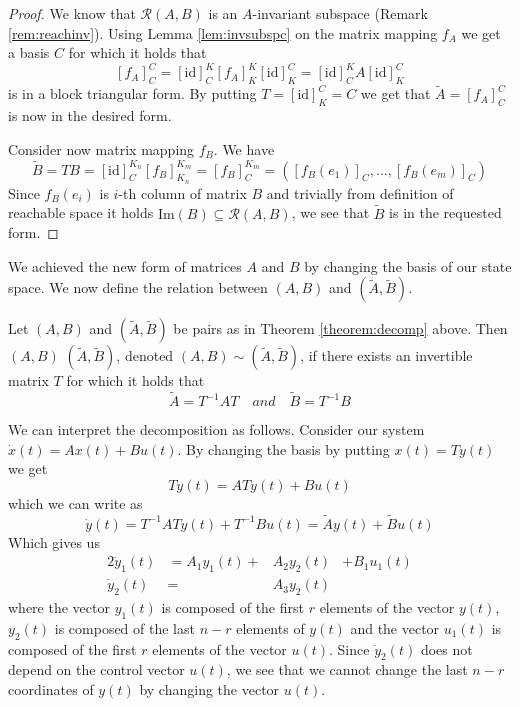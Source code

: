 \begin{proof}
	We know that $\mathcal{R}(A,B)$ is an $A$-invariant subspace (Remark \ref{rem:reachinv}). Using Lemma \ref{lem:invsubspc} on the matrix mapping $f_A$ we get a basis $C$ for which it holds that 
	$$[f_A]^C_C=[\text{id}]^K_C[f_A]^K_K[\text{id}]^C_K=[\text{id}]^K_CA[\text{id}]^C_K$$ 
	is in a block triangular form. By putting $T=[\text{id}]^C_K=C$ we get that $\widetilde{A}=[f_A]^C_C$ is now in the desired form.

	Consider now matrix mapping $f_B$. We have $$\widetilde{B}=TB=[\text{id}]^{K_n}_C[f_B]^{K_m}_{K_n}=[f_B]^{K_m}_C=([f_B(e_1)]_C,\ldots,[f_B(e_m)]_C)$$ Since $f_B(e_i)$ is $i$-th column of matrix $B$ and trivially from definition of reachable space it holds $\text{Im}(B)\subseteq \mathcal{R}(A,B)$, we see that $\widetilde{B}$ is in the requested form.
\end{proof}

We achieved the new form of matrices $A$ and $B$ by changing the basis of our state space. We now define the relation between $(A,B)$ and $(\widetilde{A},\widetilde{B}).$

\begin{definition}
	Let $(A,B)$ and $(\widetilde{A},\widetilde{B})$ be pairs as in Theorem \ref{theorem:decomp} above. Then $(A,B)$  $(\widetilde{A},\widetilde{B})$, denoted $(A,B) \sim (\widetilde{A},\widetilde{B})$, if there exists an invertible matrix $T$ for which it holds that $$\widetilde{A}=T^{-1}AT\quad and\quad\widetilde{B}=T^{-1}B$$
\end{definition}

We can interpret the decomposition as follows. Consider our system $\dot{x}(t)=Ax(t)+Bu(t)$. By changing the basis by putting $x(t)=Ty(t)$ we get 
$$T\dot{y}(t)=ATy(t)+Bu(t)$$ 
which we can write as 
$$\dot{y}(t)=T^{-1}ATy(t)+T^{-1}Bu(t)=\widetilde{A}y(t)+\widetilde{B}u(t)$$ 
Which gives us 
\begin{alignat*}{2}
	\dot{y}_1(t)&=A_1y_1(t)+&A_2y_2(t)&+B_1u_1(t) \\
	\dot{y}_2(t)&=&A_3y_2(t)&
\end{alignat*}
where the vector $y_1(t)$ is composed of the first $r$ elements of the vector $y(t)$, $y_2(t)$ is composed of the last $n-r$ elements of $y(t)$ and the vector $u_1(t)$ is composed of the first $r$ elements of the vector $u(t)$. Since $\dot{y}_2(t)$ does not depend on the control vector $u(t)$, we see that we cannot change the last $n-r$ coordinates of $y(t)$ by changing the vector $u(t)$.

